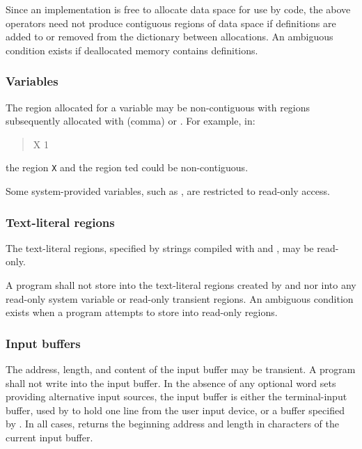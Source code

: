 Since an implementation is free to allocate data space for use by
code, the above operators need not produce contiguous regions of
data space if definitions are added to or removed from the
dictionary between allocations. An ambiguous condition exists if
deallocated memory contains definitions.


\subsubsection{Variables} %
\label{usage:var}

The region allocated for a variable may be non-contiguous with
regions subsequently allocated with \word{,} (comma) or
. For example, in:
\begin{quote}
	 X 1  
\end{quote}
the region \texttt{X} and the region ted could be
non-contiguous.

Some system-provided variables, such as , are
restricted to read-only access.


\subsubsection{Text-literal regions} %
\label{usage:"literal}

The text-literal regions, specified by strings compiled with
 and , may be read-only.

A program shall not store into the text-literal regions created
by  and  nor into any read-only system variable
or read-only transient regions. An ambiguous condition exists when
a program attempts to store into read-only regions.

\subsubsection{Input buffers} %
\label{usage:inbuf}

The address, length, and content of the input buffer may be
transient. A program shall not write into the input buffer. In the
absence of any optional word sets providing alternative input
sources, the input buffer is either the terminal-input buffer, used
by  to hold one line from the user input device, or a
buffer specified by . In all cases, 
returns the beginning address and length in characters of the
current input buffer.

